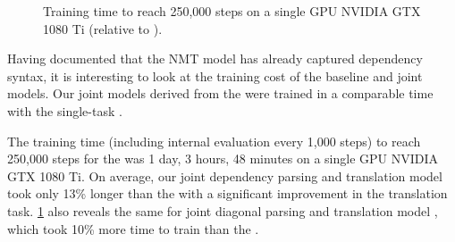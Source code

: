 \begin{figure}[t]
    \centering
    \caption{Training time to reach 250,000 steps on a single GPU NVIDIA GTX 1080 Ti (relative to \transformerbase).}
    \label{fig:training-speed}
\end{figure}

Having documented that the \transformer NMT model has already captured dependency syntax, it is interesting to look at the training cost of the baseline and joint models.
Our joint models derived from the \transformer were trained in a comparable time with the single-task \transformerbase.

The training time (including internal evaluation every 1,000 steps) to reach 250,000 steps for the \transformerbase was 1 day, 3 hours, 48 minutes on a single GPU NVIDIA GTX 1080 Ti.
On average, our joint dependency parsing and translation model \DepParse took only 13\% longer than the \transformerbase with a significant improvement in the translation task. \cref{fig:training-speed} also reveals the same for joint diagonal parsing and translation model \DiagonalParse, which took 10\% more time to train than the \transformerbase.

